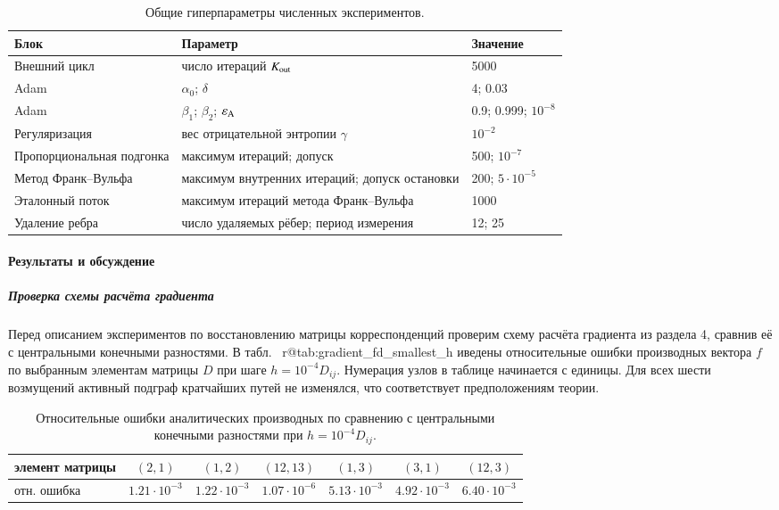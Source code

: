 \documentclass{crm-article}
\makeatletter
\def\CRMfirstoffields#1#2#3\null{#1}
\renewcommand{\ref}[1]{%
  \expandafter\let\expandafter\CRMreftemp\csname r@#1\endcsname
  \@setref\CRMreftemp\CRMfirstoffields{#1}}
\makeatother
\begin{document}
\begin{table}[!ht]
\centering
\caption{Общие гиперпараметры численных экспериментов.}
\label{tab:hyperparameters}
\medskip
\begin{tabularx}{\textwidth}{@{}lXl@{}}
\toprule
Блок & Параметр & Значение \\
\midrule
Внешний цикл & число итераций $K_{\rm out}$ & 5000 \\
Adam & $\alpha_0$; $\delta$ & 4; 0.03 \\
Adam & $\beta_1$; $\beta_2$; $\varepsilon_{\rm A}$
& 0.9; 0.999; $10^{-8}$ \\
Регуляризация & вес отрицательной энтропии $\gamma$ & $10^{-2}$ \\
Пропорциональная подгонка & максимум итераций; допуск & 500; $10^{-7}$ \\
Метод Франк--Вульфа & максимум внутренних итераций; допуск остановки
& 200; $5\cdot10^{-5}$ \\
Эталонный поток & максимум итераций метода Франк--Вульфа & 1000 \\
Удаление ребра & число удаляемых рёбер; период измерения & 12; 25 \\
\bottomrule
\end{tabularx}
\end{table}

\paragraph{Результаты и обсуждение}

\subparagraph{Проверка схемы расчёта градиента}

Перед описанием экспериментов по восстановлению матрицы корреспонденций
проверим схему расчёта градиента из раздела 4, сравнив её с центральными
конечными разностями. В табл.~\ref{tab:gradient_fd_smallest_h} приведены
относительные ошибки производных вектора $f$ по выбранным элементам матрицы
$D$ при шаге $h=10^{-4}D_{ij}$. Нумерация узлов в таблице начинается с
единицы. Для всех шести возмущений активный подграф кратчайших путей не
изменялся, что соответствует предположениям теории.

\begin{table}[htbp]
    \centering
    \setlength{\tabcolsep}{3pt}
    \caption{Относительные ошибки аналитических производных по сравнению с
    центральными конечными разностями при $h=10^{-4}D_{ij}$.}
    \label{tab:gradient_fd_smallest_h}
    \begin{tabular}{lcccccc}
        \toprule
        элемент матрицы
        & $(2,1)$ & $(1,2)$ & $(12,13)$ & $(1,3)$ & $(3,1)$ & $(12,3)$ \\
        \midrule
        отн. ошибка
        & $1.21\cdot10^{-3}$
        & $1.22\cdot10^{-3}$
        & $1.07\cdot10^{-6}$
        & $5.13\cdot10^{-3}$
        & $4.92\cdot10^{-3}$
        & $6.40\cdot10^{-3}$ \\
        \bottomrule
    \end{tabular}
\end{table}
 
\end{document}
